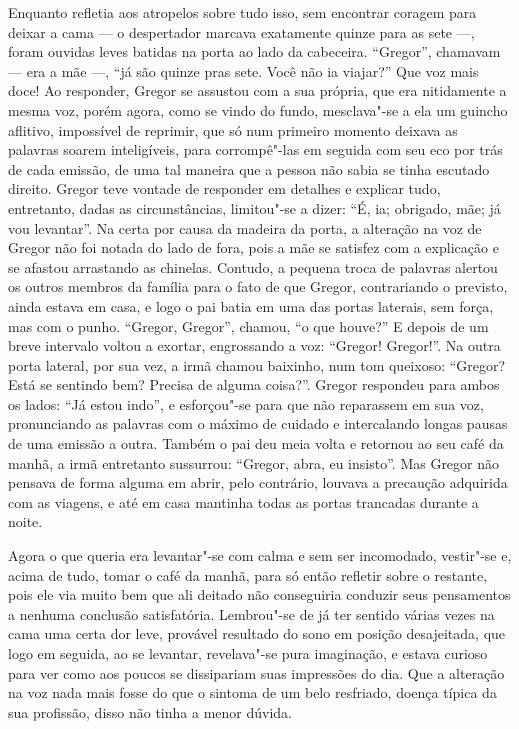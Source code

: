 Enquanto refletia aos atropelos sobre tudo isso, sem encontrar coragem
para deixar a cama --- o despertador marcava exatamente quinze para as sete
---, foram ouvidas leves batidas na porta ao lado da cabeceira. “Gregor”,
chamavam --- era a mãe ---, “já são quinze pras sete. Você não ia
viajar?” Que
voz mais doce! Ao responder, Gregor se assustou com a sua própria, que era
nitidamente a mesma voz, porém agora, como se vindo do fundo, mesclava"-se
a ela um guincho aflitivo, impossível de reprimir, que só num primeiro
momento deixava as palavras soarem inteligíveis, para corrompê"-las em
seguida com seu eco por trás de cada emissão, de uma tal maneira que a
pessoa não sabia se tinha escutado direito. Gregor teve vontade de
responder em detalhes e explicar tudo, entretanto, dadas as
circunstâncias, limitou"-se a dizer: “É, ia; obrigado, mãe; já vou
levantar”. Na certa por causa da madeira da porta, a alteração na voz de
Gregor não foi notada do lado de fora, pois a mãe se satisfez com a
explicação e se afastou arrastando as chinelas. Contudo, a pequena troca
de palavras alertou os outros membros da família para o fato de que
Gregor, contrariando o previsto, ainda estava em casa, e logo o pai batia
em uma das portas laterais, sem força, mas com o punho. “Gregor, Gregor”,
chamou, “o que houve?” E depois de um breve intervalo voltou a exortar,
engrossando a voz: “Gregor! Gregor!”. Na outra porta lateral, por sua vez,
a irmã chamou baixinho, num tom queixoso: “Gregor? Está se sentindo bem?
Precisa de alguma coisa?”. Gregor respondeu para ambos os lados: “Já estou
indo”, e esforçou"-se para que não reparassem em sua voz, pronunciando as
palavras com o máximo de cuidado e intercalando longas pausas de uma
emissão a outra. Também o pai deu meia volta e retornou ao seu café da
manhã, a irmã entretanto sussurrou: “Gregor, abra, eu insisto”. Mas Gregor
não pensava de forma alguma em abrir, pelo contrário, louvava a precaução
adquirida com as viagens, e até em casa mantinha todas as portas trancadas
durante a noite.

Agora o que queria era levantar"-se com calma e sem ser incomodado,
vestir"-se e, acima de tudo, tomar o café da manhã, para só então refletir
sobre o restante, pois ele via muito bem que ali deitado não conseguiria
conduzir seus pensamentos a nenhuma conclusão satisfatória. Lembrou"-se de
já ter sentido várias vezes na cama uma certa dor leve, provável resultado
do sono em posição desajeitada, que logo em seguida, ao se levantar,
revelava"-se pura imaginação, e estava curioso para ver como aos poucos se
dissipariam suas impressões do dia. Que a alteração na voz nada mais fosse
do que o sintoma de um belo resfriado, doença típica da sua profissão,
disso não tinha a menor dúvida.

